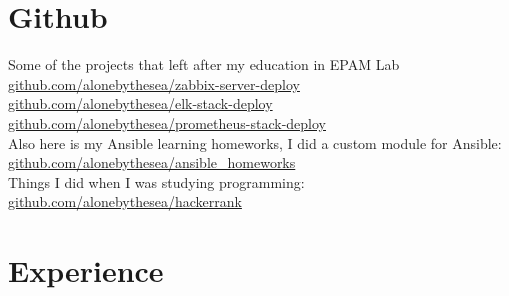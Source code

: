 \documentclass[11pt]{letter}
\newcommand{\forceindent}{\leavevmode{\parindent=1em\indent} %
}
\begin{document}
\section*{Github\vphantom{git}}


\forceindent Some of the projects that left after my education in EPAM Lab\vspace{0.2em}\\
\href{https://github.com/alonebythesea/zabbix-server-deploy}{github.com/alonebythesea/zabbix-server-deploy} \\
\href{https://github.com/alonebythesea/elk-stack-deploy}{github.com/alonebythesea/elk-stack-deploy} \\
\href{https://github.com/alonebythesea/prometheus-stack-deploy}{github.com/alonebythesea/prometheus-stack-deploy} \\
\forceindent Also here is my Ansible learning homeworks, I did a custom module for Ansible: \\
\href{https://github.com/alonebythesea/ansible_homeworks}{github.com/alonebythesea/ansible\_homeworks} \\
\forceindent Things I did when I was studying programming: \\
\href{https://github.com/alonebythesea/hackerrank}{github.com/alonebythesea/hackerrank} \\

\section*{Experience\vphantom{exp}}
\end{document}
